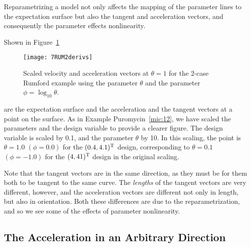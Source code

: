Reparametrizing a model not only affects the mapping of the parameter
lines to the expectation surface but also the tangent and acceleration
vectors, and consequently the parameter effects nonlinearity.

\begin{example}\label{rum:7a}

Shown in Figure~\ref{fig:RUM2derivs}
\begin{figure}
  \centerline{\texttt{[image: 7RUM2derivs]}}%
  \caption{\label{fig:RUM2derivs}
  Scaled velocity and acceleration vectors at $\theta=1$ for the
  2-case Rumford example using the parameter $\theta$ and the parameter
  $\phi=\log_{10} \theta $.  }
\end{figure}
are the expectation
surface and the acceleration and the tangent vectors at a point on
the surface.
As in Example Puromycin~\ref{mic:12}, we have scaled the parameters and
the design variable to provide a clearer figure.
The design variable is scaled by 0.1, and the parameter $\theta$ by
10.
In this scaling, the point is
$\theta = 1.0$ $( \phi = 0.0 )$ for the $( 0.4,4.1 ) \trans$ design,
corresponding to
$\theta = 0.1$ $( \phi = -1.0 )$ for the $( 4,  41 ) \trans$ design
in the original scaling.

Note that the tangent vectors are in the same direction, as they
must be for them both to be tangent to the same curve.
The {\em lengths\/} of the tangent vectors are very different, however,
and the acceleration vectors are different not only in length,
but also in orientation.
Both these differences are due to the reparametrization, and so
we see some of the effects of parameter nonlinearity.
\end{example}

\subsection{The Acceleration in an Arbitrary Direction}

